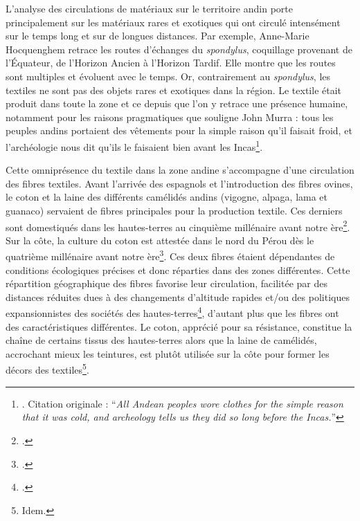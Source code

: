 L'analyse des circulations de matériaux sur le territoire andin porte principalement sur les matériaux rares et exotiques qui ont circulé intensément sur le temps long et sur de longues distances. Par exemple, Anne-Marie Hocquenghem retrace les routes d'échanges du \textit{spondylus}, coquillage provenant de l'Équateur, de l'Horizon Ancien à l'Horizon Tardif. Elle montre que les routes sont multiples et évoluent avec le temps. Or, contrairement au \textit{spondylus}, les textiles ne sont pas des objets rares et exotiques dans la région. Le textile était produit dans toute la zone et ce depuis que l'on y retrace une présence humaine, notamment pour les raisons pragmatiques que souligne John Murra : \og tous les peuples andins portaient des vêtements pour la simple raison qu'il faisait froid, et l'archéologie nous dit qu'ils le faisaient bien avant les Incas\fg\footnote{\cite[p.~716]{murraClothItsFunctions1962}. Citation originale : \textquotedblleft \textit{All Andean peoples wore clothes for the simple reason that it was cold, and archeology tells us they did so long before the Incas.}\textquotedblright}. 

Cette omniprésence du textile dans la zone andine s'accompagne d'une circulation des fibres textiles. Avant l'arrivée des espagnols et l'introduction des fibres ovines, le coton et la laine des différents camélidés andins (vigogne, alpaga, lama et guanaco) servaient de fibres principales pour la production textile. Ces derniers sont domestiqués dans les hautes-terres au cinquième millénaire avant notre ère\footcite[p.~12]{boissiereAtlasAmeriquePrecolombienne2022}. Sur la côte, la culture du coton est attestée dans le nord du Pérou dès le quatrième millénaire avant notre ère\footcite[p.~13]{boissiereAtlasAmeriquePrecolombienne2022}. Ces deux fibres étaient dépendantes de conditions écologiques précises et donc réparties dans des zones différentes. Cette répartition géographique des fibres favorise leur circulation, facilitée \og par des distances réduites dues à des changements d'altitude rapides et/ou des politiques expansionnistes des sociétés des hautes-terres\fg\footcite[p.~52]{desrosiersMatieresPremieresSavoirs2018}, d'autant plus que les fibres ont des caractéristiques différentes. Le coton, apprécié pour sa résistance, constitue la chaîne de certains tissus des hautes-terres alors que la laine de camélidés, accrochant mieux les teintures, est plutôt utilisée sur la côte pour former les décors des textiles\footnote{Idem.}.

